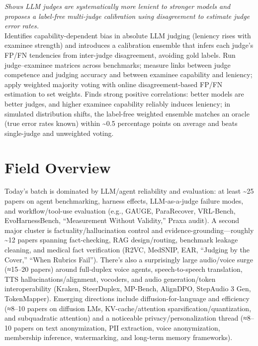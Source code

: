 \documentclass[12pt,letterpaper]{article}
\begin{document}
{\small\textit{Shows LLM judges are systematically more lenient to stronger models and proposes a label-free multi-judge calibration using disagreement to estimate judge error rates.}}\\[1pt]
{\footnotesize Identifies capability-dependent bias in absolute LLM judging (leniency rises with examinee strength) and introduces a calibration ensemble that infers each judge's FP/FN tendencies from inter-judge disagreement, avoiding gold labels. Run judge--examinee matrices across benchmarks; measure links between judge competence and judging accuracy and between examinee capability and leniency; apply weighted majority voting with online disagreement-based FP/FN estimation to set weights. Finds strong positive correlations: better models are better judges, and higher examinee capability reliably induces leniency; in simulated distribution shifts, the label-free weighted ensemble matches an oracle (true error rates known) within \textasciitilde{}0.5 percentage points on average and beats single-judge and unweighted voting.}

\medskip



\section*{Field Overview}
{\footnotesize Today's batch is dominated by LLM/agent reliability and evaluation: at least \textasciitilde{}25 papers on agent benchmarking, harness effects, LLM-as-a-judge failure modes, and workflow/tool-use evaluation (e.g., GAUGE, ParaRecover, VRL-Bench, EvoHarnessBench, ``Measurement Without Validity,'' Praxa audit). A second major cluster is factuality/hallucination control and evidence-grounding---roughly \textasciitilde{}12 papers spanning fact-checking, RAG design/routing, benchmark leakage cleaning, and medical fact verification (R2VC, MedSNIP, EAR, ``Judging by the Cover,'' ``When Rubrics Fail''). There's also a surprisingly large audio/voice surge (≈15--20 papers) around full-duplex voice agents, speech-to-speech translation, TTS hallucinations/alignment, vocoders, and audio generation/token interoperability (Kraken, SteerDuplex, MP-Bench, AlignDPO, StepAudio 3 Gen, TokenMapper). Emerging directions include diffusion-for-language and efficiency (≈8--10 papers on diffusion LMs, KV-cache/attention sparsification/quantization, and subquadratic attention) and a noticeable privacy/personalization thread (≈8--10 papers on text anonymization, PII extraction, voice anonymization, membership inference, watermarking, and long-term memory frameworks).}
\end{document}
